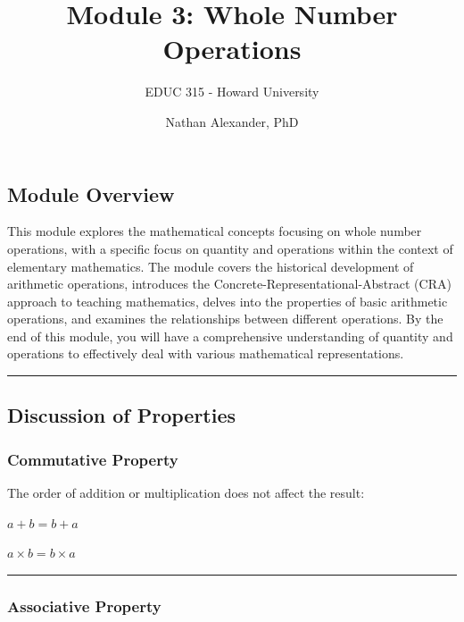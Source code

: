 \documentclass[
  letterpaper,
  DIV=11,
  numbers=noendperiod]{scrartcl}
\title{Module 3: Whole Number Operations}
\subtitle{EDUC 315 - Howard University}
\author{Nathan Alexander, PhD}
\date{}
\renewcommand*\contentsname{Table of contents}
\newcommand\contentsname{Table of contents}
\begin{document}
\maketitle

\renewcommand*\contentsname{Table of contents}
{
\hypersetup{linkcolor=}
\setcounter{tocdepth}{3}
\tableofcontents
}

\subsection{Module Overview}\label{module-overview}

This module explores the mathematical concepts focusing on whole number
operations, with a specific focus on quantity and operations within the
context of elementary mathematics. The module covers the historical
development of arithmetic operations, introduces the
Concrete-Representational-Abstract (CRA) approach to teaching
mathematics, delves into the properties of basic arithmetic operations,
and examines the relationships between different operations. By the end
of this module, you will have a comprehensive understanding of quantity
and operations to effectively deal with various mathematical
representations.

\begin{center}\rule{0.5\linewidth}{0.5pt}\end{center}

\subsection{Discussion of Properties}\label{discussion-of-properties}

\subsubsection{Commutative Property}\label{commutative-property}

The order of addition or multiplication does not affect the result:

\(a + b = b + a\)

\(a \times b = b \times a\)

\begin{center}\rule{0.5\linewidth}{0.5pt}\end{center}

\subsubsection{Associative Property}\label{associative-property}
\end{document}
